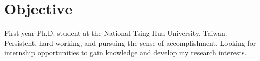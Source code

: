 \section{Objective}
First year Ph.D. student at the National Tsing Hua University, Taiwan. Persistent, hard-working, and pursuing the sense of accomplishment. Looking for internship opportunities to gain knowledge and develop my research interests.